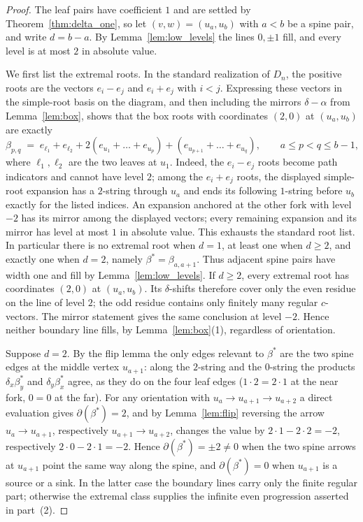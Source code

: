 \documentclass[11pt, a4paper]{amsart}
\theoremstyle{definition}
\begin{document}
\begin{proof}
The leaf pairs have coefficient $1$ and are settled by
Theorem~\ref{thm:delta_one}, so let $(v, w) = (u_a, u_b)$ with $a < b$ be a
spine pair, and write $d = b - a$. By Lemma~\ref{lem:low_levels} the lines
$0, \pm 1$ fill, and every level is at most $2$ in absolute value.

We first list the extremal roots. In the standard realization of $D_n$, the
positive roots are the vectors $e_i-e_j$ and $e_i+e_j$ with $i<j$.
Expressing these vectors in the simple-root basis on the diagram, and then
including the mirrors $\delta-\alpha$ from Lemma~\ref{lem:box}, shows that
the box roots with coordinates $(2,0)$ at $(u_a,u_b)$ are exactly
\[
  \beta_{p, q} \;=\; e_{\ell_1} + e_{\ell_2} + 2(e_{u_1} + \dots + e_{u_p})
  + (e_{u_{p+1}} + \dots + e_{u_q}),
  \qquad a \leq p < q \leq b - 1,
\]
where $\ell_1, \ell_2$ are the two leaves at $u_1$. Indeed, the
$e_i-e_j$ roots become path indicators and cannot have level $2$; among the
$e_i+e_j$ roots, the displayed simple-root expansion has a $2$-string
through $u_a$ and ends its following $1$-string before $u_b$ exactly for the
listed indices. An expansion anchored at the other fork with level $-2$ has
its mirror among the displayed vectors; every remaining expansion and its
mirror has level at most $1$ in absolute value. This exhausts the standard
root list. In particular there is no extremal root when
$d = 1$, at least one when $d\geq2$, and exactly one when $d = 2$, namely
$\beta^{*} = \beta_{a, a+1}$. Thus adjacent spine pairs have width one and
fill by Lemma~\ref{lem:low_levels}. If $d\geq2$, every extremal root has
coordinates $(2,0)$ at $(u_a,u_b)$. Its $\delta$-shifts therefore cover
only the even residue on the line of level $2$; the odd residue contains
only finitely many regular $c$-vectors. The mirror statement gives the same
conclusion at level $-2$. Hence neither boundary line fills, by
Lemma~\ref{lem:box}(1), regardless of orientation.

Suppose $d = 2$. By the flip lemma the only edges relevant to $\beta^{*}$
are the two spine edges at the middle vertex $u_{a+1}$: along the
$2$-string and the $0$-string the products $\delta_x \beta^{*}_y$ and
$\delta_y \beta^{*}_x$ agree, as they do on the four leaf edges
\textup{(}$1 \cdot 2 = 2 \cdot 1$ at the near fork, $0 = 0$ at the
far\textup{)}. For any orientation with $u_a \to u_{a+1} \to u_{a+2}$ a
direct evaluation gives $\partial(\beta^{*}) = 2$, and by
Lemma~\ref{lem:flip} reversing the arrow $u_a \to u_{a+1}$, respectively
$u_{a+1} \to u_{a+2}$, changes the value by $2 \cdot 1 - 2 \cdot 2 = -2$,
respectively $2 \cdot 0 - 2 \cdot 1 = -2$. Hence $\partial(\beta^{*}) =
\pm 2 \neq 0$ when the two spine arrows at $u_{a+1}$ point the same way
along the spine, and $\partial(\beta^{*}) = 0$ when $u_{a+1}$ is a source
or a sink. In the latter case the boundary lines carry only the finite
regular part; otherwise the extremal class supplies the infinite even
progression asserted in part~\textup{(}2\textup{)}.


\end{proof}
\end{document}
